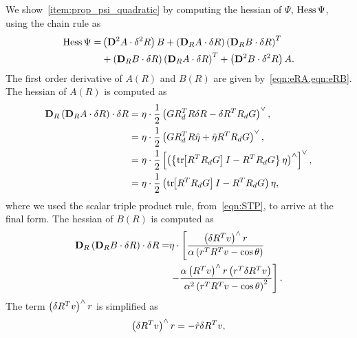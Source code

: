 \documentclass[10pt,fleqn]{IJCAS}  %
\begin{document}
\begin{multicols}{2}
We show~\cref{item:prop_psi_quadratic} by computing the hessian of \( \Psi \), \( \mathrm{Hess} \, \Psi \),  using the chain rule as 
\begin{align*}
    \mathrm{Hess} \, \Psi =& \left( \mathbf{D}^2 A \cdot \delta^2 R \right) B + \left( \mathbf{D}_{R} A \cdot \delta R  \right)\left( \mathbf{D}_{R} B \cdot \delta R \right)^T \\
    &+ \left( \mathbf{D}_{R} B \cdot \delta R  \right)\left( \mathbf{D}_{R} A \cdot \delta R \right)^T +\left( \mathbf{D}^2 B \cdot \delta^2 R \right) A .
\end{align*}
The first order derivative of \( A(R) \) and \( B(R) \) are given by~\cref{eqn:eRA,eqn:eRB}. 
The hessian of \( A(R) \) is computed as 
\begin{align*}
    \mathbf{D}_{R} \left( \mathbf{D}_{R} A \cdot \delta R \right) \cdot \delta R &= \eta \cdot \frac{1}{2}\left( G R_d^T R \delta R - \delta R^T R_d G \right)^\vee , \\
    &= \eta \cdot \frac{1}{2} \left( G R_d^T R \hat \eta + \hat \eta R^T R_d G \right)^\vee,\\
    &= \eta \cdot \frac{1}{2} \left[ \left( \left\{ \mathrm{tr}\negthickspace\left[ R^T R_d G \right] I - R^T R_d G \right\} \eta \right)^\wedge \right]^\vee , \\
    &= \eta \cdot \frac{1}{2} \left( \mathrm{tr}\negthickspace\left[ R^T R_d G \right] I - R^T R_d G \right)\eta ,
\end{align*}
where we used the scalar triple product rule, from~\cref{eqn:STP}, to arrive at the final form.
The hessian of \( B(R) \) is computed as
\begin{align*}
    \mathbf{D}_{R} \left( \mathbf{D}_{R} B \cdot \delta R \right) \cdot \delta R =& \eta \cdot \left[\frac{\left( \delta R^T v \right)^\wedge r}{\alpha\left( r^T R^T v - \cos \theta \right)} \right. \\
    & \left. - \frac{\alpha \left( R^T v \right)^\wedge r \left( r^T \delta R^T v \right)}{\alpha^2 \left( r^TR^Tv - \cos \theta \right)^2}   \right] .
\end{align*}
The term \( \left( \delta R^T v \right)^\wedge r\) is simplified as
\begin{align*}
    \parenth{\delta R^T v}^\wedge r &= - \hat{r} \delta R ^T v , \\

\end{align*}
\end{multicols}
\end{document}
